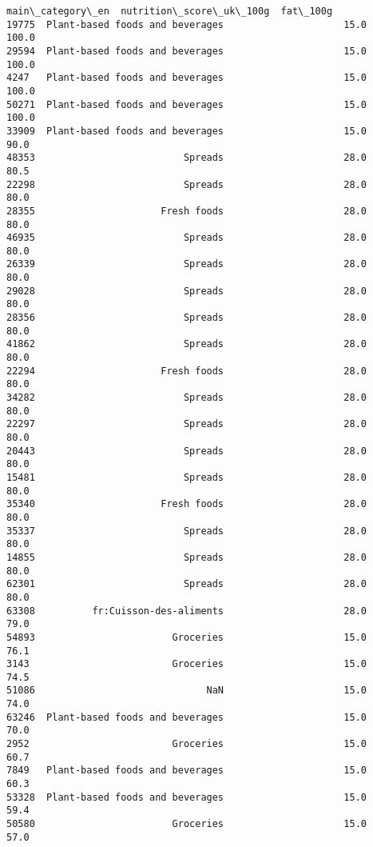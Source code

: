 \documentclass[11pt]{article}
\makeatletter
\newcommand{\boxspacing}{\kern\kvtcb@left@rule\kern\kvtcb@boxsep}
\newcommand{\prompt}[4]{
        \ttfamily\llap{{\color{#2}[#3]:\hspace{3pt}#4}}\vspace{-\baselineskip}
    }
\makeatother
\begin{document}
            \begin{tcolorbox}[breakable, size=fbox, boxrule=.5pt, pad at break*=1mm, opacityfill=0]
\prompt{Out}{outcolor}{121}{\boxspacing}
\begin{Verbatim}[commandchars=\\\{\}]
                      main\_category\_en  nutrition\_score\_uk\_100g  fat\_100g
19775  Plant-based foods and beverages                     15.0     100.0
29594  Plant-based foods and beverages                     15.0     100.0
4247   Plant-based foods and beverages                     15.0     100.0
50271  Plant-based foods and beverages                     15.0     100.0
33909  Plant-based foods and beverages                     15.0      90.0
48353                          Spreads                     28.0      80.5
22298                          Spreads                     28.0      80.0
28355                      Fresh foods                     28.0      80.0
46935                          Spreads                     28.0      80.0
26339                          Spreads                     28.0      80.0
29028                          Spreads                     28.0      80.0
28356                          Spreads                     28.0      80.0
41862                          Spreads                     28.0      80.0
22294                      Fresh foods                     28.0      80.0
34282                          Spreads                     28.0      80.0
22297                          Spreads                     28.0      80.0
20443                          Spreads                     28.0      80.0
15481                          Spreads                     28.0      80.0
35340                      Fresh foods                     28.0      80.0
35337                          Spreads                     28.0      80.0
14855                          Spreads                     28.0      80.0
62301                          Spreads                     28.0      80.0
63308          fr:Cuisson-des-aliments                     28.0      79.0
54893                        Groceries                     15.0      76.1
3143                         Groceries                     15.0      74.5
51086                              NaN                     15.0      74.0
63246  Plant-based foods and beverages                     15.0      70.0
2952                         Groceries                     15.0      60.7
7849   Plant-based foods and beverages                     15.0      60.3
53328  Plant-based foods and beverages                     15.0      59.4
50580                        Groceries                     15.0      57.0

\end{Verbatim}
\end{tcolorbox}
\end{document}
